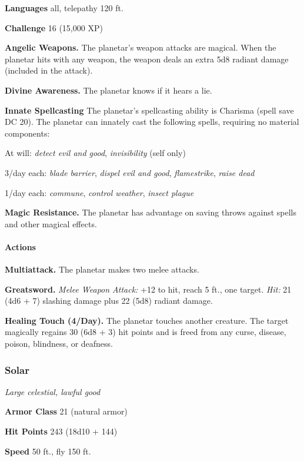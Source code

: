 \documentclass[
]{article}
\begin{document}
\textbf{Languages} all, telepathy 120 ft.

\textbf{Challenge} 16 (15,000 XP)

\textbf{Angelic Weapons.} The planetar's weapon attacks are magical.
When the planetar hits with any weapon, the weapon deals an extra 5d8
radiant damage (included in the attack).

\textbf{Divine Awareness.} The planetar knows if it hears a lie.

\textbf{Innate Spellcasting} The planetar's spellcasting ability is
Charisma (spell save DC 20). The planetar can innately cast the
following spells, requiring no material components:

At will: \emph{detect evil and good}, \emph{invisibility} (self only)

3/day each: \emph{blade barrier}, \emph{dispel evil and good},
\emph{flamestrike}, \emph{raise dead}

1/day each: \emph{commune}, \emph{control weather}, \emph{insect plague}

\textbf{Magic Resistance.} The planetar has advantage on saving throws
against spells and other magical effects.

\hypertarget{actions-2}{%
\paragraph{Actions}\label{actions-2}}

\textbf{Multiattack.} The planetar makes two melee attacks.

\textbf{Greatsword.} \emph{Melee Weapon Attack:} +12 to hit, reach 5
ft., one target. \emph{Hit:} 21 (4d6 + 7) slashing damage plus 22 (5d8)
radiant damage.

\textbf{Healing Touch (4/Day).} The planetar touches another creature.
The target magically regains 30 (6d8 + 3) hit points and is freed from
any curse, disease, poison, blindness, or deafness.

\hypertarget{solar}{%
\subsubsection{Solar}\label{solar}}

\emph{Large celestial, lawful good}

\textbf{Armor Class} 21 (natural armor)

\textbf{Hit Points} 243 (18d10 + 144)

\textbf{Speed} 50 ft., fly 150 ft.
\end{document}
